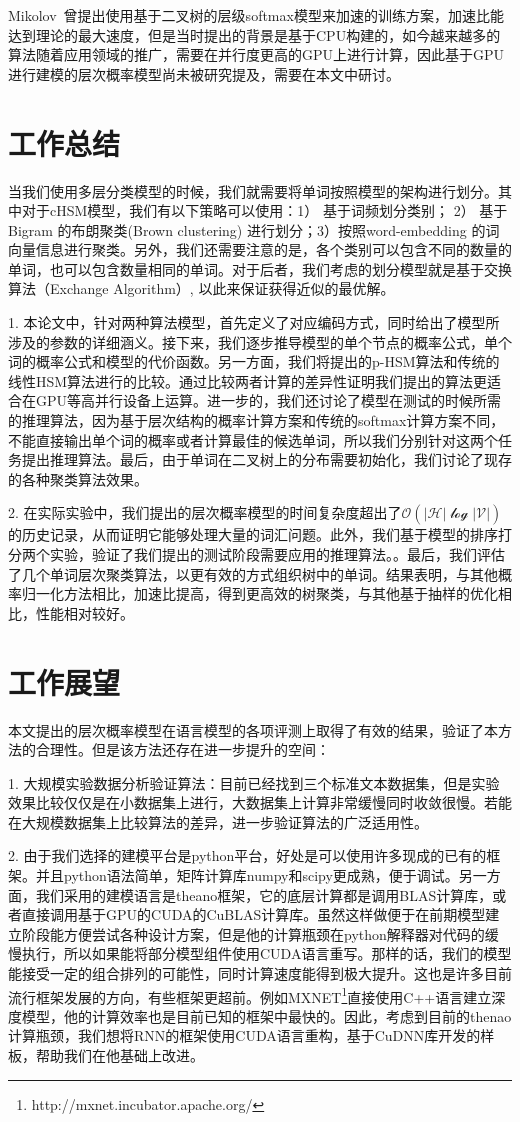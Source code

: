 \summary

Mikolov~曾提出使用基于二叉树的层级softmax模型来加速的训练方案，加速比能达到理论的最大速度，但是当时提出的背景是基于CPU构建的，如今越来越多的算法随着应用领域的推广，需要在并行度更高的GPU上进行计算，因此基于GPU进行建模的层次概率模型尚未被研究提及，需要在本文中研讨。
\section*{工作总结}
当我们使用多层分类模型的时候，我们就需要将单词按照模型的架构进行划分。其中对于cHSM模型，我们有以下策略可以使用：1） 基于词频划分类别； 2） 基于Bigram 的布朗聚类(Brown clustering) 进行划分；3）按照word-embedding 的词向量信息进行聚类。另外，我们还需要注意的是，各个类别可以包含不同的数量的单词，也可以包含数量相同的单词。对于后者，我们考虑的划分模型就是基于交换算法（Exchange Algorithm）, 以此来保证获得近似的最优解。


1. 本论文中，针对两种算法模型，首先定义了对应编码方式，同时给出了模型所涉及的参数的详细涵义。接下来，我们逐步推导模型的单个节点的概率公式，单个词的概率公式和模型的代价函数。另一方面，我们将提出的p-HSM算法和传统的线性HSM算法进行的比较。通过比较两者计算的差异性证明我们提出的算法更适合在GPU等高并行设备上运算。进一步的，我们还讨论了模型在测试的时候所需的推理算法，因为基于层次结构的概率计算方案和传统的softmax计算方案不同，不能直接输出单个词的概率或者计算最佳的候选单词，所以我们分别针对这两个任务提出推理算法。最后，由于单词在二叉树上的分布需要初始化，我们讨论了现存的各种聚类算法效果。

2. 在实际实验中，我们提出的层次概率模型的时间复杂度超出了$\mathcal{O(|H|\log|V|)}$的历史记录，从而证明它能够处理大量的词汇问题。此外，我们基于模型的排序打分两个实验，验证了我们提出的测试阶段需要应用的推理算法。。最后，我们评估了几个单词层次聚类算法，以更有效的方式组织树中的单词。结果表明，与其他概率归一化方法相比，加速比提高，得到更高效的树聚类，与其他基于抽样的优化相比，性能相对较好。

\section*{工作展望}
本文提出的层次概率模型在语言模型的各项评测上取得了有效的结果，验证了本方法的合理性。但是该方法还存在进一步提升的空间：

1. 大规模实验数据分析验证算法：目前已经找到三个标准文本数据集，但是实验效果比较仅仅是在小数据集上进行，大数据集上计算非常缓慢同时收敛很慢。若能在大规模数据集上比较算法的差异，进一步验证算法的广泛适用性。

2. 由于我们选择的建模平台是python平台，好处是可以使用许多现成的已有的框架。并且python语法简单，矩阵计算库numpy和scipy更成熟，便于调试。另一方面，我们采用的建模语言是theano框架，它的底层计算都是调用BLAS计算库，或者直接调用基于GPU的CUDA的CuBLAS计算库。虽然这样做便于在前期模型建立阶段能方便尝试各种设计方案，但是他的计算瓶颈在python解释器对代码的缓慢执行，所以如果能将部分模型组件使用CUDA语言重写。那样的话，我们的模型能接受一定的组合排列的可能性，同时计算速度能得到极大提升。这也是许多目前流行框架发展的方向，有些框架更超前。例如MXNET\footnote{http://mxnet.incubator.apache.org/}直接使用C++语言建立深度模型，他的计算效率也是目前已知的框架中最快的。因此，考虑到目前的thenao计算瓶颈，我们想将RNN的框架使用CUDA语言重构，基于CuDNN库开发的样板，帮助我们在他基础上改进。

